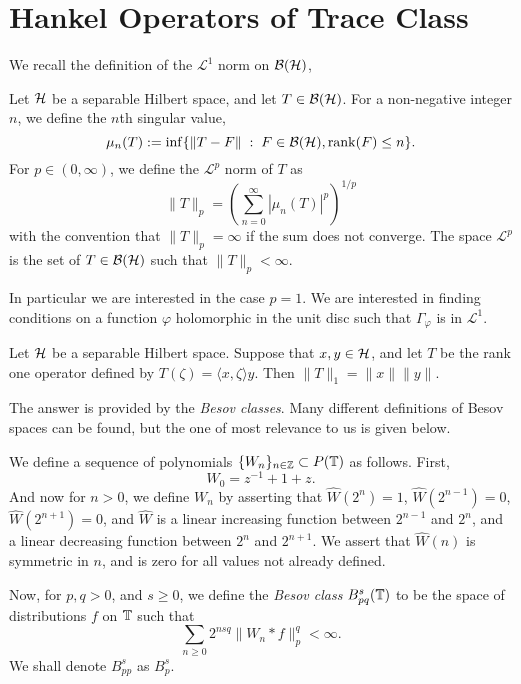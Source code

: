 \section{Hankel Operators of Trace Class}
We recall the definition of the $\mathcal{L}^1$ norm on $\mathcal{B}(\mathcal{H})$,
\begin{definition}
    Let $\mathcal{H}$ be a separable Hilbert space, and let $T \in \mathcal{B}(\mathcal{H})$. 
    For a non-negative integer $n$, we define the $n$th singular value,
    \begin{equation}
        \mu_n(T) := \inf\{\|T-F\| \;:\;F \in \mathcal{B}(\mathcal{H}),\operatorname{rank}(F) \leq n\}.
    \end{equation}
    For $p \in (0,\infty)$, we define the $\mathcal{L}^p$ norm of $T$
    as
    \begin{equation}
        \|T\|_p = \left(\sum_{n=0}^\infty |\mu_n(T)|^p\right)^{1/p}
    \end{equation}
    with the convention that $\|T\|_p = \infty$ if the sum does not
    converge. The space $\mathcal{L}^p$ is the set of $T \in \mathcal{B}(\mathcal{H})$
    such that $\|T\|_p < \infty$.
\end{definition}



In particular we are interested in the case $p = 1$. We are interested
in finding conditions on a function $\varphi$ holomorphic in the unit disc
such that $\Gamma_\varphi$ is in $\mathcal{L}^1$. 

\begin{lemma}
    Let $\mathcal{H}$ be a separable Hilbert space. Suppose
    that $x,y \in \mathcal{H}$, and let $T$ be the rank one operator
    defined by $T(\zeta) = \langle x,\zeta\rangle y$. Then $\|T\|_1 = \|x\|\|y\|$.
\end{lemma}

The answer is provided by the \emph{Besov classes}. Many different definitions
of Besov spaces can be found, but the one of most relevance to us is given below.
\begin{definition}
    \label{besovDefinition}
    We define a sequence of polynomials $\{W_n\}_{n \in \mathbb{Z}} \subset P(\mathbb{T})$ as follows.
    First,
    \begin{equation}
        W_0 = z^{-1}+1+z.
    \end{equation}
    And now for $n > 0$, we define $W_n$ by asserting that $\widehat{W}(2^n) = 1$,
    $\widehat{W}(2^{n-1}) = 0$, $\widehat{W}(2^{n+1}) = 0$, and $\widehat{W}$
    is a linear increasing function between $2^{n-1}$ and $2^n$, and a
    linear decreasing function between $2^n$ and $2^{n+1}$. We
    assert that $\widehat{W}(n)$ is symmetric in $n$, and is zero for all
    values not already defined.
    
    Now, for $p,q > 0$, and $s \geq 0$, we define the \emph{Besov class}
    $B_{pq}^s(\mathbb{T})$ to be the space of distributions $f$ on $\mathbb{T}$ such that
    \begin{equation}
        \sum_{n\geq 0} 2^{nsq} \|W_n*f\|_{p}^q < \infty.
    \end{equation}  
    We shall denote $B_{pp}^s$ as $B_p^s$.
\end{definition}

